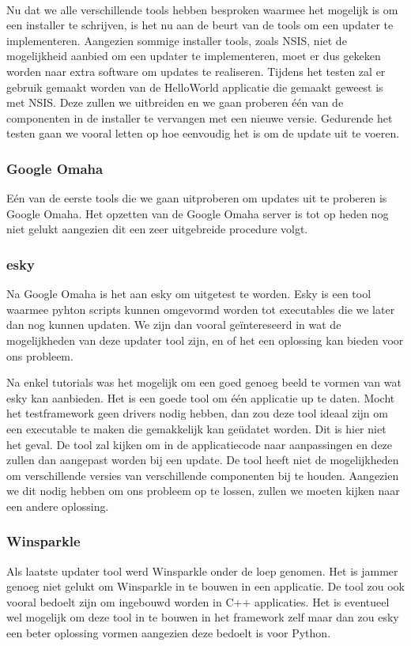 \documentclass{article}
\begin{document}
\paragraph{}
Nu dat we alle verschillende tools hebben besproken waarmee het mogelijk is om een installer te schrijven, is het nu aan de beurt van de tools om een updater te implementeren.
Aangezien sommige installer tools, zoals NSIS, niet de mogelijkheid aanbied om een updater te implementeren, moet er dus gekeken worden naar extra software om updates te realiseren.
Tijdens het testen zal er gebruik gemaakt worden van de HelloWorld applicatie die gemaakt geweest is met NSIS.
Deze zullen we uitbreiden en we gaan proberen \'e\'en van de componenten in de installer te vervangen met een nieuwe versie.
Gedurende het testen gaan we vooral letten op hoe eenvoudig het is om de update uit te voeren.

\subsubsection{Google Omaha}
E\'en van de eerste tools die we gaan uitproberen om updates uit te proberen is Google Omaha.
Het opzetten van de Google Omaha server is tot op heden nog niet gelukt aangezien dit een zeer uitgebreide procedure volgt.

\subsubsection{esky}
Na Google Omaha is het aan esky om uitgetest te worden.
Esky is een tool waarmee pyhton scripts kunnen omgevormd worden tot executables die we later dan nog kunnen updaten.
We zijn dan vooral ge\"intereseerd in wat de mogelijkheden van deze updater tool zijn, en of het een oplossing kan bieden voor ons probleem.

Na enkel tutorials was het mogelijk om een goed genoeg beeld te vormen van wat esky kan aanbieden.
Het is een goede tool om \'e\'en applicatie up te daten.
Mocht het testframework geen drivers nodig hebben, dan zou deze tool ideaal zijn om een executable te maken die gemakkelijk kan ge\"udatet worden.
Dit is hier niet het geval.
De tool zal kijken om in de applicatiecode naar aanpassingen en deze zullen dan aangepast worden bij een update.
De tool heeft niet de mogelijkheden om verschillende versies van verschillende componenten bij te houden.
Aangezien we dit nodig hebben om ons probleem op te lossen, zullen we moeten kijken naar een andere oplossing.

\subsubsection{Winsparkle}
Als laatste updater tool werd Winsparkle onder de loep genomen.
Het is jammer genoeg niet gelukt om Winsparkle in te bouwen in een applicatie.
De tool zou ook vooral bedoelt zijn om ingebouwd worden in C++ applicaties.
Het is eventueel wel mogelijk om deze tool in te bouwen in het framework zelf maar dan zou esky een beter oplossing vormen aangezien deze bedoelt is voor Python.
\end{document}
